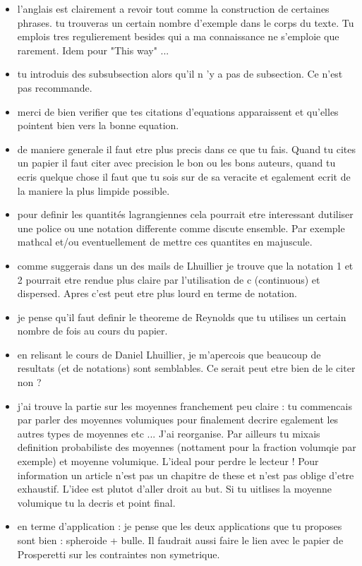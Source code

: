 {\begin{itemize}
\item l'anglais est clairement a revoir tout comme la construction de certaines phrases. tu trouveras un certain nombre d'exemple dans le corps du texte. Tu emplois tres regulierement besides qui a ma connaissance ne s'emploie que rarement. Idem pour "This way" ...
\item tu introduis des subsubsection alors qu'il n 'y a pas de subsection. Ce n'est pas recommande.
\item merci de bien verifier que tes citations d'equations apparaissent et qu'elles pointent bien vers la bonne equation.
\item de maniere generale il faut etre plus precis dans ce que tu fais. Quand tu cites un papier il faut citer avec precision le bon ou les bons auteurs, quand tu ecris quelque chose il faut que tu sois sur de sa veracite et egalement ecrit de la maniere la plus limpide possible.
\item pour definir les quantités lagrangiennes cela pourrait etre interessant dutiliser une police ou une notation differente comme discute ensemble. Par exemple mathcal et/ou eventuellement de mettre ces quantites en majuscule.
\item comme suggerais dans un des mails de Lhuillier je trouve que la notation 1 et 2 pourrait etre rendue plus claire par l'utilisation de c (continuous) et dispersed. Apres c'est peut etre plus lourd en terme de notation.
\item je pense qu'il faut definir le theoreme de Reynolds que tu utilises un certain nombre de fois au cours du papier.
\item en relisant le cours de Daniel Lhuillier, je m'apercois que beaucoup de resultats (et de notations) sont semblables. Ce serait peut etre bien de le citer non ?
\item j'ai trouve la partie sur les moyennes franchement peu claire : tu commencais par parler des moyennes volumiques pour finalement decrire egalement les autres types de moyennes etc ... J'ai reorganise. Par ailleurs tu mixais definition probabiliste des moyennes (nottament pour la fraction volumqie par exemple) et moyenne volumique. L'ideal pour perdre le lecteur ! Pour information un article n'est pas un chapitre de these et n'est pas oblige d'etre exhaustif. L'idee est plutot d'aller droit au but. Si tu uitlises la moyenne volumique tu la decris et point final.
\item en terme d'application : je pense que les deux applications que tu proposes sont bien : spheroide + bulle. Il faudrait aussi faire le lien avec le papier de Prosperetti sur les contraintes non symetrique.

\end{itemize}}
